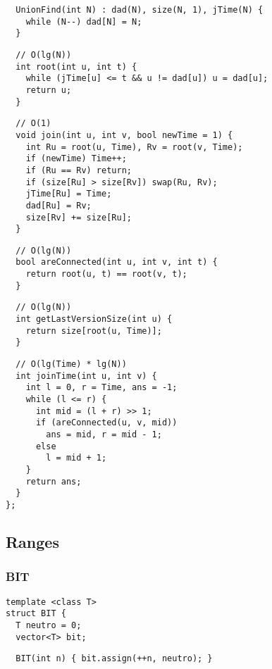 \documentclass[twoside]{article}
\begin{document}
\begin{multicols*}{2}
\begin{verbatim}
  UnionFind(int N) : dad(N), size(N, 1), jTime(N) {
    while (N--) dad[N] = N;
  }
\end{verbatim}
\vspace{-12pt}
\begin{verbatim}
  // O(lg(N))
  int root(int u, int t) {
    while (jTime[u] <= t && u != dad[u]) u = dad[u];
    return u;
  }
\end{verbatim}
\vspace{-12pt}
\begin{verbatim}
  // O(1)
  void join(int u, int v, bool newTime = 1) {
    int Ru = root(u, Time), Rv = root(v, Time);
    if (newTime) Time++;
    if (Ru == Rv) return;
    if (size[Ru] > size[Rv]) swap(Ru, Rv);
    jTime[Ru] = Time;
    dad[Ru] = Rv;
    size[Rv] += size[Ru];
  }
\end{verbatim}
\vspace{-12pt}
\begin{verbatim}
  // O(lg(N))
  bool areConnected(int u, int v, int t) {
    return root(u, t) == root(v, t);
  }
\end{verbatim}
\vspace{-12pt}
\begin{verbatim}
  // O(lg(N))
  int getLastVersionSize(int u) {
    return size[root(u, Time)];
  }
\end{verbatim}
\vspace{-12pt}
\begin{verbatim}
  // O(lg(Time) * lg(N))
  int joinTime(int u, int v) {
    int l = 0, r = Time, ans = -1;
    while (l <= r) {
      int mid = (l + r) >> 1;
      if (areConnected(u, v, mid))
        ans = mid, r = mid - 1;
      else
        l = mid + 1;
    }
    return ans;
  }
};
\end{verbatim}

\subsectionfont{\bfseries\sffamily\centering\LARGE}
\vspace{0em}
\subsection*{Ranges}
\vspace{2em}
\subsubsectionfont{\large\bfseries\sffamily\underline}
\subsubsection*{BIT}
\begin{verbatim}
template <class T>
struct BIT {
  T neutro = 0;
  vector<T> bit;
\end{verbatim}
\vspace{-12pt}
\begin{verbatim}
  BIT(int n) { bit.assign(++n, neutro); }


\end{verbatim}
\end{multicols*}
\end{document}
